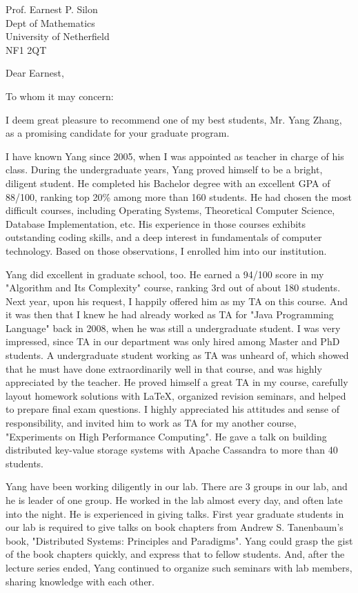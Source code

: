 \documentclass[xelatex]{styles/rec-letter-3} %
\begin{document}
\begin{letter}{
Prof. Earnest P. Silon \\  
Dept of Mathematics\\
University of Netherfield\\
NF1 2QT}

\subject{Departmental \LaTeX{} Letter Class similar to Word Version}  

\opening{Dear Earnest,}  %
To whom it may concern:

I deem great pleasure to recommend one of my best students, Mr. Yang Zhang, as a promising candidate for your graduate program.

I have known Yang since 2005, when I was appointed as teacher in charge of his class. During the undergraduate years, Yang proved himself to be a bright, diligent student. He completed his Bachelor degree with an excellent GPA of 88/100, ranking top 20\% among more than 160 students. He had chosen the most difficult courses, including Operating Systems, Theoretical Computer Science, Database Implementation, etc. His experience in those courses exhibits outstanding coding skills, and a deep interest in fundamentals of computer technology. Based on those observations, I enrolled him into our institution.

Yang did excellent in graduate school, too. He earned a 94/100 score in my "Algorithm and Its Complexity" course, ranking 3rd out of about 180 students. Next year, upon his request, I happily offered him as my TA on this course. And it was then that I knew he had already worked as TA for "Java Programming Language" back in 2008, when he was still a undergraduate student. I was very impressed, since TA in our department was only hired among Master and PhD students. A undergraduate student working as TA was unheard of, which showed that he must have done extraordinarily well in that course, and was highly appreciated by the teacher. He proved himself a great TA in my course, carefully layout homework solutions with LaTeX, organized revision seminars, and helped to prepare final exam questions. I highly appreciated his attitudes and sense of responsibility, and invited him to work as TA for my another course, "Experiments on High Performance Computing". He gave a talk on building distributed key-value storage systems with Apache Cassandra to more than 40 students.

Yang have been working diligently in our lab. There are 3 groups in our lab, and he is leader of one group. He worked in the lab almost every day, and often late into the night. He is experienced in giving talks. First year graduate students in our lab is required to give talks on book chapters from Andrew S. Tanenbaum's book, "Distributed Systems: Principles and Paradigms". Yang could grasp the gist of the book chapters quickly, and express that to fellow students. And, after the lecture series ended, Yang continued to organize such seminars with lab members, sharing knowledge with each other.




\end{letter}
\end{document}
